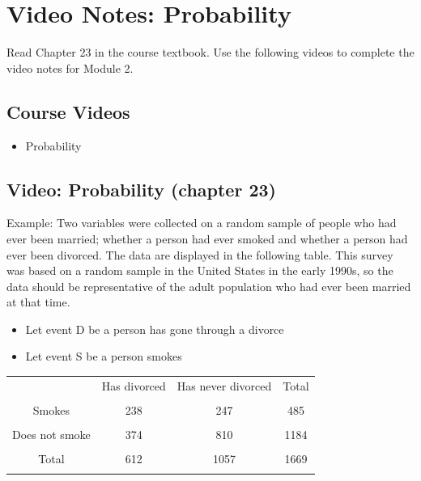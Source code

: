 \documentclass[
]{report}
\providecommand{\tightlist}{%
  \setlength{\itemsep}{0pt}\setlength{\parskip}{0pt}}
\begin{document}
\newpage

\section{Video Notes: Probability}\label{video-notes-probability}

Read Chapter 23 in the course textbook. Use the following videos to complete the video notes for Module 2.

\subsection{Course Videos}\label{course-videos-1}

\begin{itemize}
\tightlist
\item
  Probability
\end{itemize}


\subsection*{Video: Probability (chapter 23)}\label{video-probability-chapter-23}

Example: Two variables were collected on a random sample of people who had ever been married; whether a person had ever smoked and whether a person had ever been divorced. The data are displayed in the following table. This survey was based on a random sample in the United States in the early 1990s, so the data should be representative of the adult population who had ever been married at that time.

\begin{itemize}
\item
  Let event D be a person has gone through a divorce
\item
  Let event S be a person smokes
\end{itemize}

\begin{center}
\begin{tabular}{|c|c|c|c|} \hline
\hspace{0.8in} & \hspace{0.35in} Has divorced \hspace{.35in} & \hspace{0.35in} Has never divorced  \hspace{0.35in} & \hspace{0.3in} Total \hspace{0.3in} \\ 
& & & \\ \hline
Smokes & 238 & 247 & 485 \\ 
& & & \\ \hline
Does not smoke & 374 & 810 & 1184 \\ 
& & & \\ \hline
Total & 612 & 1057 & 1669 \\ 
& & & \\ \hline
\end{tabular}
\end{center}
\vspace{.1in}
\end{document}
